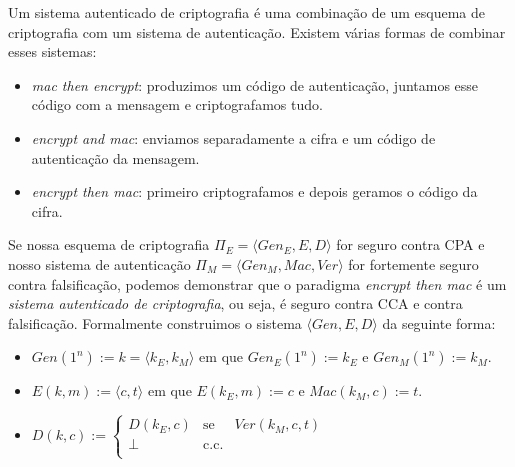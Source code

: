 


Um sistema autenticado de criptografia é uma combinação de um esquema de criptografia com um sistema de autenticação.
Existem várias formas de combinar esses sistemas:
\begin{itemize}
\item {\em mac then encrypt}: produzimos um código de autenticação, juntamos esse código com a mensagem e criptografamos tudo.
\item {\em encrypt and mac}: enviamos separadamente a cifra e um código de autenticação da mensagem.
\item {\em encrypt then mac}: primeiro criptografamos e depois geramos o código da cifra.
\end{itemize}

Se nossa esquema de criptografia $\Pi_E = \langle Gen_E, E, D\rangle$ for seguro contra CPA e nosso sistema de autenticação $\Pi_M = \langle Gen_M, Mac, Ver \rangle$ for fortemente seguro contra falsificação, podemos demonstrar que o paradigma {\em encrypt then mac} é um {\em sistema autenticado de criptografia}, ou seja, é seguro contra CCA e contra falsificação.
Formalmente construimos o sistema $\langle Gen, E, D \rangle$ da seguinte forma:
\begin{itemize}
\item $Gen(1^n) := k = \langle k_E, k_M \rangle$ em que $Gen_E(1^n) := k_E$ e $Gen_M(1^n) := k_M$.
\item $E(k,m) := \langle c, t \rangle$ em que $E(k_E, m) := c$ e $Mac(k_M, c) := t$.
\item $D(k,c) := \left\{
    \begin{array}{lcl}
      D(k_E, c) & \textrm{se} & Ver(k_M, c, t)\\
      \bot & \textrm{c.c.} &\\
    \end{array}
    \right.$
\end{itemize}

